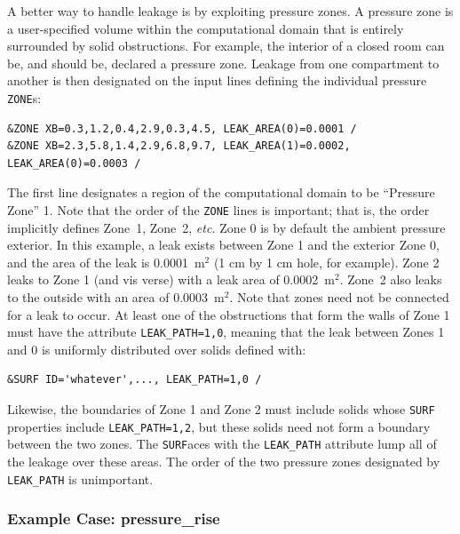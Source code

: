 \documentclass[11pt]{book}
\newcommand{\ct}{\tt\small}
\begin{document}
A better way to handle leakage is by exploiting pressure zones. A pressure zone is a user-specified volume within the computational domain that is
entirely surrounded by solid obstructions. For example, the interior of a closed room can be, and should be, declared a pressure zone. Leakage from one
compartment to another is then designated on the input lines defining the individual pressure {\ct ZONE}s:

\footnotesize
\begin{verbatim}
&ZONE XB=0.3,1.2,0.4,2.9,0.3,4.5, LEAK_AREA(0)=0.0001 /
&ZONE XB=2.3,5.8,1.4,2.9,6.8,9.7, LEAK_AREA(1)=0.0002, LEAK_AREA(0)=0.0003 /
\end{verbatim}
\normalsize

\noindent
The first line designates a region of the computational domain to be ``Pressure Zone'' 1. Note that the order of the {\ct ZONE} lines is important; that is, the order
implicitly defines Zone~1, Zone~2, {\em etc.}
Zone 0 is by default the ambient pressure exterior.
In this example, a leak exists between Zone 1 and the exterior Zone 0, and the area of the leak
is 0.0001~m$^2$ (1 cm by 1 cm hole, for example). Zone 2 leaks to Zone 1 (and vis verse)
with a leak area of 0.0002~m$^2$. Zone~2 also leaks to the outside with an area of 0.0003~m$^2$. Note that zones need not be connected for a leak to occur.
At least one of the obstructions that form the walls of Zone 1 must have the attribute
{\ct LEAK\_PATH=1,0}, meaning that the leak between Zones 1 and 0 is uniformly distributed
over solids defined with:

\footnotesize
\begin{verbatim}
&SURF ID='whatever',..., LEAK_PATH=1,0 /
\end{verbatim}
\normalsize

\noindent
Likewise, the boundaries of Zone 1 and Zone 2 must include solids whose {\ct SURF} properties include {\ct LEAK\_PATH=1,2}, but these solids need not form a boundary between the
two zones. The {\ct SURF}aces with the {\ct LEAK\_PATH} attribute lump all of the
leakage over these areas. The order of the two pressure zones designated by {\ct LEAK\_PATH} is unimportant.


\subsubsection{Example Case: {\bf pressure\_rise}}
\end{document}
